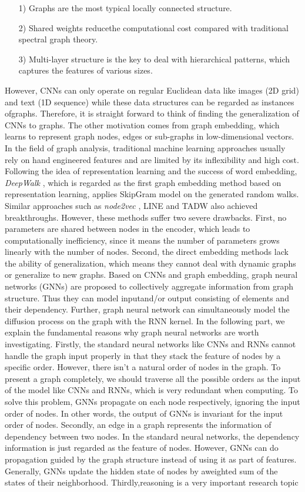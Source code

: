 \documentclass[12pt,a4paper]{article}
\begin{document}
\begin{itemize}
\item[1)] Graphs are the most typical locally connected structure. 
\item[2)] Shared weights reducethe computational  cost  compared with traditional spectral graph theory. 
\item[3)] Multi-layer structure is the key to deal with hierarchical patterns, which captures the features of various sizes.
\end{itemize}

However, CNNs can only operate on regular Euclidean data like images (2D grid) and text (1D sequence) while these data structures can be regarded as instances ofgraphs. Therefore, it is straight forward to think of finding the generalization of CNNs to graphs. The other motivation comes from graph embedding, which learns to represent graph nodes, edges or sub-graphs in low-dimensional vectors. In the field of graph analysis, traditional machine learning approaches usually rely on hand  engineered features and are limited by its inflexibility and high cost. Following  the idea of representation learning and the success of word embedding, \textit{DeepWalk} ,  which is regarded as the first graph embedding method based on representation learning, applies SkipGram  model on the generated random walks. Similar approaches  such as \textit{node2vec} ,  LINE  and TADW also achieved breakthroughs. However,  these methods suffer two severe drawbacks. First, no parameters are shared between nodes in the encoder, which leads to computationally inefficiency, since it means the number of parameters grows linearly with the number of nodes. Second, the direct  embedding methods lack the ability of generalization, which means they cannot deal with dynamic graphs or generalize to new graphs. Based on CNNs and graph embedding,  graph neural networks (GNNs) are proposed to collectively aggregate information from graph structure. Thus they can model inputand/or output consisting of elements and their dependency. Further,  graph  neural  network can simultaneously model the diffusion process on the graph with the RNN kernel. In the following part, we  explain the fundamental reasons why graph neural networks are worth investigating. Firstly, the standard neural networks like CNNs and RNNs cannot handle the graph  input properly in that they stack the feature of nodes by a specific order.  However,  there isn’t a natural order of nodes in the graph. To present a graph completely, we should traverse all the possible orders as the input of the model  like CNNs and RNNs, which is very redundant when computing. To solve this  problem, GNNs propagate on each node respectively, ignoring the input order of nodes. In other words, the output of GNNs is invariant for the input order of nodes.  Secondly, an edge in a graph represents the information of dependency between two  nodes. In the standard neural networks, the dependency information is just regarded  as the feature of nodes. However, GNNs can do propagation guided by the graph  structure instead of using it as part of features. Generally, GNNs update  the  hidden state of nodes by aweighted sum of the states of their neighborhood. Thirdly,reasoning is a very important research topic 
\end{document}
